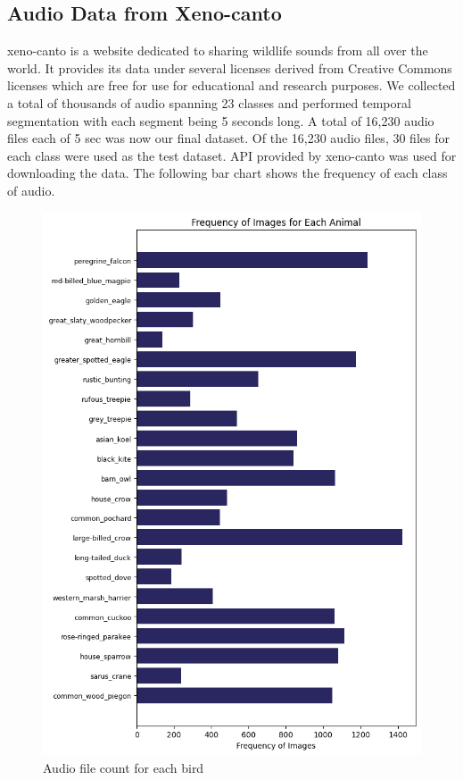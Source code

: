 \documentclass[fleqn, 10pt, twoside]{IOEGC}
\begin{document}
\subsection{Audio Data from Xeno-canto}
xeno-canto is a website dedicated to sharing wildlife sounds from all over the world. It provides its data under several licenses derived from Creative Commons licenses which are free for use for educational and research purposes. We collected a total of thousands of audio spanning 23 classes and performed temporal segmentation with each segment being 5 seconds long. A total of 16,230 audio files each of 5 sec was now our final dataset. Of the 16,230 audio files, 30 files for each class were used as the test dataset.
API provided by xeno-canto was used for downloading the data. The following bar chart shows the frequency of each class of audio.

	{

		\begin{figure}
			\centering
			\includegraphics[scale=0.5]{Graphics/xenocanto.png}
			\caption{Audio file count for each bird}
			\label{fig: audio_file_count}
		\end{figure}

	}
\end{document}
